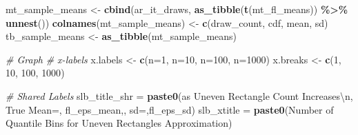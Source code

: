 \documentclass[
]{book}
\newenvironment{Shaded}{\begin{snugshade}}{\end{snugshade}}
\newcommand{\CharTok}[1]{\textcolor[rgb]{0.31,0.60,0.02}{#1}}
\newcommand{\CommentTok}[1]{\textcolor[rgb]{0.56,0.35,0.01}{\textit{#1}}}
\newcommand{\DecValTok}[1]{\textcolor[rgb]{0.00,0.00,0.81}{#1}}
\newcommand{\KeywordTok}[1]{\textcolor[rgb]{0.13,0.29,0.53}{\textbf{#1}}}
\newcommand{\NormalTok}[1]{#1}
\newcommand{\OperatorTok}[1]{\textcolor[rgb]{0.81,0.36,0.00}{\textbf{#1}}}
\newcommand{\StringTok}[1]{\textcolor[rgb]{0.31,0.60,0.02}{#1}}
\begin{document}
\begin{Shaded}
\begin{Highlighting}[]
\NormalTok{mt\_sample\_means \textless{}{-}}\StringTok{ }\KeywordTok{cbind}\NormalTok{(ar\_it\_draws, }\KeywordTok{as\_tibble}\NormalTok{(}\KeywordTok{t}\NormalTok{(mt\_fl\_means)) }\OperatorTok{\%\textgreater{}\%}\StringTok{ }\KeywordTok{unnest}\NormalTok{())}
\KeywordTok{colnames}\NormalTok{(mt\_sample\_means) \textless{}{-}}\StringTok{ }\KeywordTok{c}\NormalTok{(}\StringTok{\textquotesingle{}draw\_count\textquotesingle{}}\NormalTok{, }\StringTok{\textquotesingle{}cdf\textquotesingle{}}\NormalTok{, }\StringTok{\textquotesingle{}mean\textquotesingle{}}\NormalTok{, }\StringTok{\textquotesingle{}sd\textquotesingle{}}\NormalTok{)}
\NormalTok{tb\_sample\_means \textless{}{-}}\StringTok{ }\KeywordTok{as\_tibble}\NormalTok{(mt\_sample\_means)}

\CommentTok{\# Graph}
\CommentTok{\# x{-}labels}
\NormalTok{x.labels \textless{}{-}}\StringTok{ }\KeywordTok{c}\NormalTok{(}\StringTok{\textquotesingle{}n=1\textquotesingle{}}\NormalTok{, }\StringTok{\textquotesingle{}n=10\textquotesingle{}}\NormalTok{, }\StringTok{\textquotesingle{}n=100\textquotesingle{}}\NormalTok{, }\StringTok{\textquotesingle{}n=1000\textquotesingle{}}\NormalTok{)}
\NormalTok{x.breaks \textless{}{-}}\StringTok{ }\KeywordTok{c}\NormalTok{(}\DecValTok{1}\NormalTok{, }\DecValTok{10}\NormalTok{, }\DecValTok{100}\NormalTok{, }\DecValTok{1000}\NormalTok{)}

\CommentTok{\# Shared Labels}
\NormalTok{slb\_title\_shr =}\StringTok{ }\KeywordTok{paste0}\NormalTok{(}\StringTok{\textquotesingle{}as Uneven Rectangle Count Increases}\CharTok{\textbackslash{}n}\StringTok{\textquotesingle{}}\NormalTok{,}
                       \StringTok{\textquotesingle{}True Mean=\textquotesingle{}}\NormalTok{, fl\_eps\_mean,}\StringTok{\textquotesingle{}, sd=\textquotesingle{}}\NormalTok{,fl\_eps\_sd)}
\NormalTok{slb\_xtitle =}\StringTok{ }\KeywordTok{paste0}\NormalTok{(}\StringTok{\textquotesingle{}Number of Quantile Bins for Uneven Rectangles Approximation\textquotesingle{}}\NormalTok{)}


\end{Highlighting}
\end{Shaded}
\end{document}
